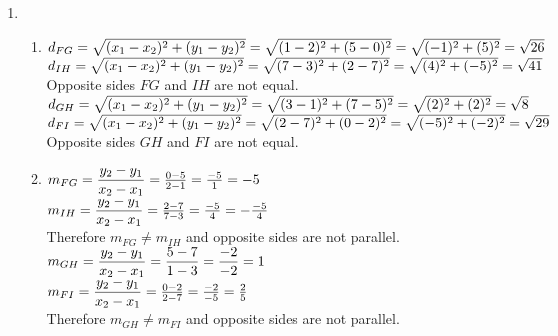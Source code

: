 \begin{eocsolutions}{}
{\begin{enumerate}[itemsep=5pt, label=\textbf{\arabic*}. ]
\item  %
    \begin{enumerate}[itemsep=5pt, label=\textbf{(\alph*)} ] 
\item
$d_{FG} = \sqrt{(x_1-x_2)^2+(y_1-y_2)^2}\\
    = \sqrt{(1-2)^2+(5-0)^2}\\
    = \sqrt{(-1)^2+(5)^2}\\
    = \sqrt{26}$\\

$d_{IH} = \sqrt{(x_1-x_2)^2+(y_1-y_2)^2}\\
    = \sqrt{(7-3)^2+(2-7)^2}\\
    = \sqrt{(4)^2+(-5)^2}\\
    = \sqrt{41}$\\
Opposite sides $FG$ and $IH$ are not equal.\\
$d_{GH} = \sqrt{(x_1-x_2)^2+(y_1-y_2)^2}\\
    = \sqrt{(3-1)^2+(7-5)^2}\\
    = \sqrt{(2)^2+(2)^2}\\
    = \sqrt{8}$\\

$d_{FI} = \sqrt{(x_1-x_2)^2+(y_1-y_2)^2}\\
    = \sqrt{(2-7)^2+(0-2)^2}\\
    = \sqrt{(-5)^2+(-2)^2}\\
    = \sqrt{29}$\\
Opposite sides $GH$ and $FI$ are not equal.\\

\item
$m_{FG} = \dfrac{y_2-y_1}{x_2-x_1}\\
    = \frac{0-5}{2-1}\\
    = \frac{-5}{1}\\
    = -5$\\

$m_{IH} = \dfrac{y_2-y_1}{x_2-x_1}\\
    = \frac{2-7}{7-3}\\
    = \frac{-5}{4}\\
    = -\frac{-5}{4}$\\
Therefore $m_{FG}\ne m_{IH}$ and opposite sides are not parallel.\\

$m_{GH} = \dfrac{y_2-y_1}{x_2-x_1}\\
    = \dfrac{5-7}{1-3}\\
    = \dfrac{-2}{-2}\\
    = 1$\\
$m_{FI} = \dfrac{y_2-y_1}{x_2-x_1}\\
    = \frac{0-2}{2-7}\\
    = \frac{-2}{-5}\\
    = \frac{2}{5}$\\
Therefore $m_{GH}\ne m_{FI}$ and opposite sides are not parallel.\\


\end{enumerate}
\end{enumerate}}
\end{eocsolutions}
